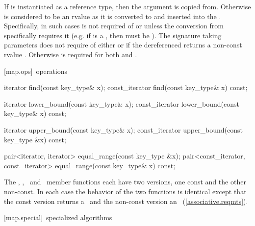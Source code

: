 \documentclass[american,twoside]{book}
\begin{document}
\begin{itemdescr}
\pnum
{}

If  is instantiated as a reference type, then
the argument  is copied from. Otherwise 
is considered to be an rvalue as it is converted to
 and inserted into the .
Specifically, in such cases  is not required of
 or 
unless the conversion from  specifically
requires it (e.g. if  is a 
, then
 must be ).
The signature taking 
parameters does not require 
of either  or
 if the dereferenced 
returns a non-const rvalue
. Otherwise
 is required for
both  and .
\end{itemdescr}

[map.ops]{\ operations}

\begin{itemdecl}
iterator       find(const key_type& x);
const_iterator find(const key_type& x) const;

iterator       lower_bound(const key_type& x);
const_iterator lower_bound(const key_type& x) const;

iterator       upper_bound(const key_type& x);
const_iterator upper_bound(const key_type &x) const;

pair<iterator, iterator>
  equal_range(const key_type &x);
pair<const_iterator, const_iterator>
  equal_range(const key_type& x) const;
\end{itemdecl}

\begin{itemdescr}
\pnum
The
,
,
\
and
\
member functions each have two versions,
one const and the other non-const.
In each case the behavior of the two functions is identical
except that the const version returns a
\tcode{const_iterator}\
and the non-const version an
\tcode{iterator}\
(\ref{associative.reqmts}).
\end{itemdescr}

[map.special]{\ specialized algorithms}
\end{document}
